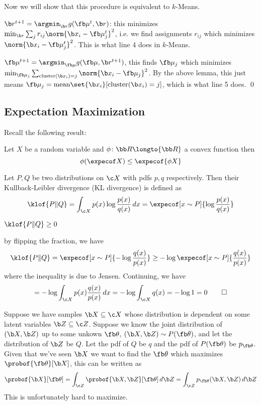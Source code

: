 Now we will show that this procedure is equivalent to {\tencsc $k$-Means}.
\benum
    \item $\b r^{t+1}=\argmin_{\b r}g(\fb\mu^t,\b r)$: this minimizes $\min_{\b r}\sum_jr_{ij}\norm{\b x_i-\fb\mu_j^t}^2$, i.e. we find assignments $r_{ij}$ which minimizes $\norm{\b x_i-\fb\mu_j^t}^2$.
    This is what line 4 does in {\tencsc $k$-Means}.
    \item $\fb\mu^{t+1}=\argmin_{\fb\mu}g(\fb\mu,\b r^{t+1})$, this finds $\fb\mu_j$ which minimizes $\min_{\fb\mu_j}\sum_{{\rm cluster}(\b x_i)=j}\norm{\b x_i-\fb\mu_j}^2$.
    By the above lemma, this just means $\fb\mu_j={\rm mean}\set{\b x_i}[{\rm cluster}(\b x_i)=j]$, which is what line 5 does.
\eenum
\qed

\subsection{Expectation Maximization}

Recall the following result:

\bthrm[title=Jensen's Inequality]

    Let $X$ be a random variable and $\phi\colon{\bb R}\longto{\bb R}$ a convex function then
    $$ \phi(\expecof X) \leq \expecof{\phi X} $$

\ethrm

\bdefn

    Let $P,Q$ be two distributions on $\c X$ with pdfs $p,q$ respectively.
    Then their {\emphcolor Kullback-Leibler divergence} (KL divergence) is defined as
    $$ \klof{P\|Q} = \int_{\c X}p(x)\log\frac{p(x)}{q(x)}\,dx = \expecof[x\sim P]{\log\frac{p(x)}{q(x)}} $$

\edefn

\bthrm

    $\klof{P\|Q}\geq0$

\ethrm

\Proof by flipping the fraction, we have
$$ \klof{P\|Q} = \expecof[x\sim P]{-\log\frac{q(x)}{p(x)}} \geq -\log\expecof[x\sim P]{\frac{q(x)}{p(x)}} $$
where the inequality is due to Jensen.
Continuing, we have
$$ = -\log\int_{\c X}p(x)\frac{q(x)}{p(x)}\,dx = -\log\int_{\c X}q(x) = -\log1 = 0 \qed $$

Suppose we have samples $\b X\subseteq\c X$ whose distribution is dependent on some latent variables $\b Z\subseteq\c Z$.
Suppose we know the joint distribution of $(\b X,\b Z)$ up to some unkown $\fb\theta$, $(\b X,\b Z)\sim P(\fb\theta)$, and let the distribution of $\b Z$ be $Q$.
Let the pdf of $Q$ be $q$ and the pdf of $P(\fb\theta)$ be $p_{\fb\theta}$.
Given that we've seen $\b X$ we want to find the $\fb\theta$ which maximizes $\probof{\fb\theta}[\b X]$, this can be written as
$$ \probof{\b X}[\fb\theta] = \int_{\c Z}\probof{\b X,\b Z}[\fb\theta]\,d\b Z = \int_{\c Z}p_{\fb\theta}(\b X,\b Z)\,d\b Z $$
This is unfortunately hard to maximize.

